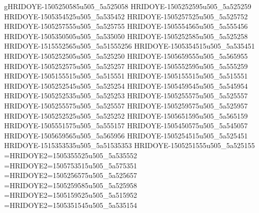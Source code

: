 gHRIDOYE-1505250585u505_5a525058
HRIDOYE-1505252595u505_5a525259
HRIDOYE-1505354525u505_5a535452
HRIDOYE-1505257525u505_5a525752
HRIDOYE-1505257555u505_5a525755
HRIDOYE-1505554565u505_5a555456
HRIDOYE-1505350505u505_5a535050
HRIDOYE-1505252585u505_5a525258
HRIDOYE-1515552565u505_5a51555256
HRIDOYE-1505354515u505_5a535451
HRIDOYE-1505252505u505_5a525250
HRIDOYE-1505659555u505_5a565955
HRIDOYE-1505252575u505_5a525257
HRIDOYE-1505552595u505_5a555259
HRIDOYE-1505155515u505_5a515551
HRIDOYE-1505155515u505_5a515551
HRIDOYE-1505252545u505_5a525254
HRIDOYE-1505459545u505_5a545954
HRIDOYE-1505252535u505_5a525253
HRIDOYE-1505255575u505_5a525557
HRIDOYE-1505255575u505_5a525557
HRIDOYE-1505259575u505_5a525957
HRIDOYE-1505252525u505_5a525252
HRIDOYE-1505651595u505_5a565159
HRIDOYE-1505551575u505_5a555157
HRIDOYE-1505450575u505_5a545057
HRIDOYE-1505659565u505_5a565956
HRIDOYE-1505254515u505_5a525451
HRIDOYE-1515353535u505_5a51535353
HRIDOYE-1505251555u505_5a525155
=HRIDOYE2=1505355525u505_5a535552
=HRIDOYE2=1505753515u505_5a575351
=HRIDOYE2=1505256575u505_5a525657
=HRIDOYE2=1505259585u505_5a525958
=HRIDOYE2=1505159525u505_5a515952
=HRIDOYE2=1505351545u505_5a535154
